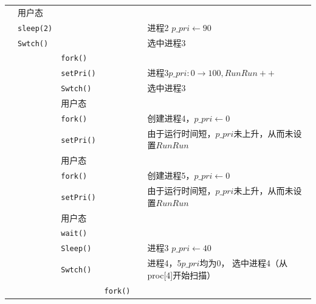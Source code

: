 \begin{landscape}
\begin{longtable}{llllll}
                 &     用户态            &         &           &             &            \\
                 &    \texttt{sleep(2)} &          &           &      & 进程2 $p\_pri\gets90$      \\
                 &     \texttt{Swtch()} &          &           &             &选中进程3                  \\
                 &                      & \texttt{fork()}       &           &             &  \\
                 &                      & \texttt{setPri()}    &           &             &进程3$p\_pri:0\rightarrow 100,RunRun++$ \\
                 &                      & \texttt{Swtch()}    &           &             &选中进程3 \\
                 &                      &用户态               &           &             & \\
                 &                      & \texttt{fork()}    &           &             &创建进程4，$p\_pri\gets0$                  \\
                 &                      & \texttt{setPri()}    &           &             &由于运行时间短，$p\_pri$未上升，从而未设置$RunRun$ \\
                 &                      &用户态              &           &             & \\
                 &                      & \texttt{fork()}    &           &             &创建进程5，$p\_pri\gets0$                  \\
                 &                      & \texttt{setPri()}    &           &             &由于运行时间短，$p\_pri$未上升，从而未设置$RunRun$ \\
                 &                      &用户态               &           &             & \\
                 &                      & \texttt{wait()}    &           &             & \\
                 &                      & \texttt{Sleep()}    &           &             &进程3 $p\_pri\gets40$ \\
                 &                      & \texttt{Swtch()}    &           &             &\makecell[l]{进程4，5$p\_pri$均为0，\\选中进程4（从proc[4]开始扫描）} \\
                 &                      &     & \texttt{fork()}    &                        &\\

\end{longtable}
\end{landscape}
